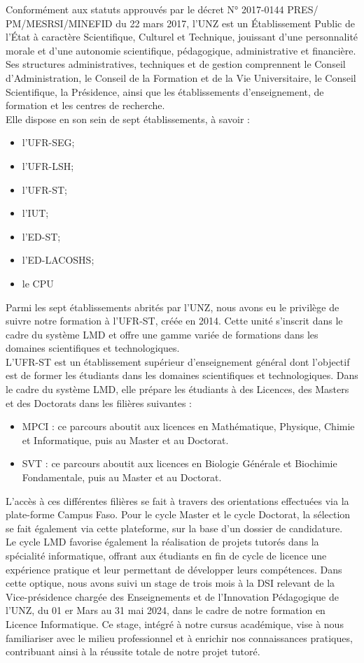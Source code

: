 Conformément aux statuts approuvés par le décret N° 2017-0144 PRES/ PM/MESRSI/MINEFID du 22 mars 2017, l'UNZ est un Établissement Public de l'État à caractère Scientifique, Culturel et Technique, jouissant d'une personnalité morale et d'une autonomie scientifique, pédagogique, administrative et financière. Ses structures administratives, techniques et de gestion comprennent le Conseil d'Administration, le Conseil de la Formation et de la Vie Universitaire, le Conseil Scientifique, la Présidence, ainsi que les établissements d'enseignement, de formation et les centres de recherche.\\
Elle dispose en son sein de sept établissements, à savoir :
\begin{itemize}
	\item[\ding{118}] l'UFR-SEG;
	\item[\ding{118}] l'UFR-LSH;
	\item[\ding{118}] l'UFR-ST;
	\item[\ding{118}] l'IUT;
	\item[\ding{118}] l'ED-ST;
	\item[\ding{118}] l'ED-LACOSHS;
	\item[\ding{118}] le CPU
\end{itemize}
Parmi les sept établissements abrités par l'UNZ, nous avons eu le privilège de suivre notre formation à l'UFR-ST, créée en 2014. Cette unité s'inscrit dans le cadre du système LMD et offre une gamme variée de formations dans les domaines scientifiques et technologiques.\\
L’UFR-ST est un établissement supérieur d’enseignement général dont l’objectif est de former les étudiants dans les domaines scientifiques et technologiques. Dans le cadre du système LMD, elle prépare les étudiants à des Licences, des Masters et des Doctorats dans les filières suivantes :
\begin{itemize}
   \item[\ding{118}] MPCI : ce parcours aboutit aux licences en Mathématique, Physique, Chimie et Informatique, puis au Master et au Doctorat.
    
    \item[\ding{118}] SVT : ce parcours aboutit aux licences en Biologie Générale et Biochimie Fondamentale, puis au Master et au Doctorat.
\end{itemize}
L'accès à ces différentes filières se fait à travers des orientations effectuées via la plate-forme Campus Faso. Pour le cycle Master et le cycle Doctorat, la sélection se fait également via cette plateforme, sur la base d'un dossier de candidature.\\
Le cycle LMD favorise également la réalisation de projets tutorés dans la spécialité informatique, offrant aux étudiants en fin de cycle de licence une expérience pratique et leur permettant de développer leurs compétences.
Dans cette optique, nous avons suivi un stage de trois mois à la DSI relevant de la Vice-présidence chargée des Enseignements et de l'Innovation Pédagogique de l'UNZ, du 01 er Mars au 31 mai 2024, dans le cadre de notre formation en Licence Informatique. Ce stage, intégré à notre cursus académique, vise à nous familiariser avec le milieu professionnel et à enrichir nos connaissances pratiques, contribuant ainsi à la réussite totale de notre projet tutoré.